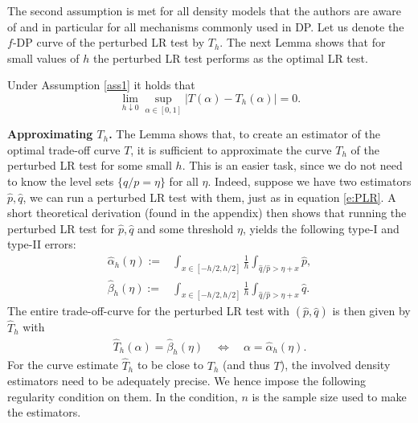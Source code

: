 The second assumption is met for all density models that the authors are aware of and in particular for all mechanisms commonly used in DP. %
Let us denote the $f$-DP curve of the perturbed LR test by $T_h$. The next Lemma shows that for small values of $h$ the perturbed LR test performs as the optimal LR test.
\begin{lem} \label{lem1}
Under Assumption \ref{ass1} it holds that
\[
\lim_{h \downarrow 0} \sup_{\alpha \in [0,1]}|T(\alpha)-T_h(\alpha)|=0.
\]
\end{lem}
 \textbf{Approximating $T_h$.} The Lemma shows that, to create an estimator of the optimal trade-off curve $T$, it is sufficient to approximate the curve $T_h$ of the perturbed LR test for some small $h$. This is an easier task, since we do not need to know the level sets $\{q/p=\eta\}$ for all $\eta$. Indeed, suppose we have two estimators $\hat p, \hat q$, we can run a perturbed LR test with them, just as in equation \eqref{e:PLR}. A short theoretical derivation (found in the appendix) then shows that running the perturbed LR test for $\hat p, \hat q$ and some threshold $\eta$, yields the following type-I and type-II errors:
\begin{align}
\hat \alpha_h(\eta) := &\int_{x \in [-h/2,h/2]} \frac{1}{h}\int_{\hat q /\hat p  > \eta +x} \hat p , \\\hat \beta_h(\eta) :=& \int_{x \in [-h/2,h/2]} \frac{1}{h}  \int_{\hat q /\hat p  > \eta +x} \hat q .
\end{align}
The entire trade-off-curve for the perturbed LR test with $(\hat p, \hat q)$ is then given by $\hat T_h$ with
\begin{align} \label{e:def:Th}
\hat T_h(\alpha) = \hat \beta_h(\eta) \quad \Leftrightarrow \quad \alpha = \hat \alpha_h(\eta).
\end{align}
For the curve estimate $\hat T_h$ to be close to $T_h$ (and thus $T$), the involved density estimators need to be adequately precise. We hence impose the following regularity condition on them. In the condition, $n$ is the sample size used to make the estimators.
